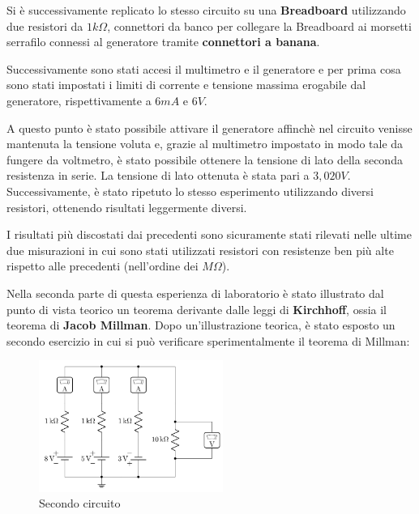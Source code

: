     Si è successivamente replicato lo stesso circuito su una \textbf{Breadboard} utilizzando due resistori da
    $1k\Omega$, connettori da banco per collegare la Breadboard ai morsetti serrafilo connessi al generatore
    tramite \textbf{connettori a banana}. \par
    Successivamente sono stati accesi il multimetro e il generatore e per prima cosa sono stati impostati i limiti di corrente e tensione massima
    erogabile dal generatore, rispettivamente a $6mA$ e $6V$.\par
    A questo punto è stato possibile attivare il generatore affinchè nel circuito venisse mantenuta la tensione voluta e,
    grazie al multimetro impostato in modo tale da fungere da voltmetro, è stato possibile ottenere la tensione di lato della
    seconda resistenza in serie. La tensione di lato ottenuta è stata pari a $3,020V$.
    Successivamente, è stato ripetuto lo stesso esperimento utilizzando diversi resistori, ottenendo risultati leggermente diversi.\par
    I risultati più discostati dai precedenti sono sicuramente stati rilevati nelle ultime due misurazioni in cui sono stati utilizzati
    resistori con resistenze ben più alte rispetto alle precedenti (nell'ordine dei $M\Omega$).\par
    \par
    \newpage
    Nella seconda parte di questa esperienza di laboratorio è stato illustrato dal punto di vista teorico
    un teorema derivante dalle leggi di \textbf{Kirchhoff}, ossia il teorema di \textbf{Jacob Millman}.
    Dopo un'illustrazione teorica, è stato esposto un secondo esercizio in cui si può verificare sperimentalmente il teorema di Millman:
    
    \begin{figure}[!h]
        \begin{center}
            \includegraphics[width = 6cm]{ese2.png}
            \caption{Secondo circuito}
            \label{ese2}
        \end{center}
    \end{figure}

